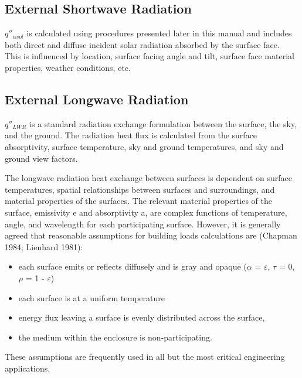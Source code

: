 \subsection{External Shortwave Radiation}\label{external-shortwave-radiation}

\(q''_{\alpha sol}\) is calculated using procedures presented later in this manual and includes both direct and diffuse incident solar radiation absorbed by the surface face.~ This is influenced by location, surface facing angle and tilt, surface face material properties, weather conditions, etc.

\subsection{External Longwave Radiation}\label{external-longwave-radiation}

\({q''_{LWR}}\) is a standard radiation exchange formulation between the surface, the sky, and the ground. The radiation heat flux is calculated from the surface absorptivity, surface temperature, sky and ground temperatures, and sky and ground view factors.

The longwave radiation heat exchange between surfaces is dependent on surface temperatures, spatial relationships between surfaces and surroundings, and material properties of the surfaces. The relevant material properties of the surface, emissivity e and absorptivity a, are complex functions of temperature, angle, and wavelength for each participating surface. However, it is generally agreed that reasonable assumptions for building loads calculations are (Chapman 1984; Lienhard 1981):

\begin{itemize}
\item
  each surface emits or reflects diffusely and is gray and opaque ($\alpha$ = $\varepsilon$, $\tau$ = 0, $\rho$ = 1 - $\varepsilon$)
\item
  each surface is at a uniform temperature
\item
  energy flux leaving a surface is evenly distributed across the surface,
\item
  the medium within the enclosure is non-participating.
\end{itemize}

These assumptions are frequently used in all but the most critical engineering applications.


